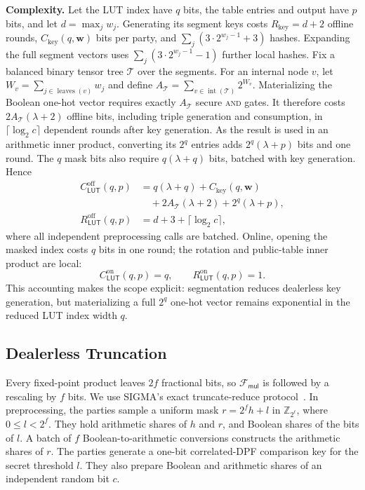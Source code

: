 \documentclass[journal]{IEEEtran}
\theoremstyle{definition}
\theoremstyle{plain}
\newcommand{\Fmul}{\mathcal{F}_{\mathsf{mul}}}
\newcommand{\nseg}{c}                              %
\newcommand{\wseg}{w}                              %
\begin{document}
\textbf{Complexity.} Let the LUT index have $q$ bits, the table entries and
output have $p$ bits, and let
$d=\max_j\wseg_j$. Generating its segment keys costs
$R_{\mathrm{key}}=d+2$ offline rounds,
$C_{\mathrm{key}}(q,\boldsymbol{\wseg})$ bits per party, and
$\sum_j(3\cdot2^{\wseg_j-1}+3)$ hashes. Expanding the full segment vectors
uses $\sum_j(3\cdot2^{\wseg_j-1}-1)$ further local hashes. Fix a balanced binary tensor tree
$\mathcal T$ over the segments. For an internal node $v$, let
$W_v=\sum_{j\in\operatorname{leaves}(v)}\wseg_j$ and define
$A_{\mathcal T}=\sum_{v\in\operatorname{int}(\mathcal T)}2^{W_v}$.
Materializing the Boolean one-hot vector requires exactly $A_{\mathcal T}$
secure \textsc{and} gates. It therefore costs
$2A_{\mathcal T}(\lambda+2)$ offline bits, including triple generation and
consumption, in $\lceil\log_2\nseg\rceil$ dependent rounds after key
generation. As the result is used in an arithmetic inner product, converting
its $2^q$ entries adds $2^q(\lambda+p)$ bits and one round. The $q$ mask bits
also require $q(\lambda+q)$ bits, batched with key generation. Hence
\begin{equation}
\begin{aligned}
C^{\mathrm{off}}_{\mathsf{LUT}}(q,p)
 &=q(\lambda+q)+C_{\mathrm{key}}(q,\boldsymbol{\wseg})\\
 &\quad+2A_{\mathcal T}(\lambda+2)+2^q(\lambda+p),\\
R^{\mathrm{off}}_{\mathsf{LUT}}(q,p)&=d+3+\lceil\log_2\nseg\rceil,
\end{aligned}
\label{eq:lut-offline-cost}
\end{equation}
where all independent preprocessing calls are batched. Online, opening the
masked index costs $q$ bits in one round; the rotation and public-table inner
product are local:
\begin{equation}
C^{\mathrm{on}}_{\mathsf{LUT}}(q,p)=q,\qquad
R^{\mathrm{on}}_{\mathsf{LUT}}(q,p)=1.
\label{eq:lut-online-cost}
\end{equation}
This accounting makes the scope explicit: segmentation reduces dealerless key
generation, but materializing a full $2^q$ one-hot vector remains exponential
in the reduced LUT index width $q$.

\subsection{Dealerless Truncation}\label{sec:trunc}
Every fixed-point product leaves $2f$ fractional bits, so $\Fmul$ is followed
by a rescaling by $f$ bits. We use SIGMA's exact truncate-reduce
protocol~\cite{sigma}. In preprocessing, the parties sample a uniform mask
$r=2^f h+l$ in $\mathbb Z_{2^\ell}$, where $0\le l<2^f$. They hold arithmetic
shares of $h$ and $r$, and Boolean shares of the bits of $l$. A batch of
$f$ Boolean-to-arithmetic conversions constructs the arithmetic shares of $r$.
The parties generate a one-bit correlated-DPF comparison key for the secret
threshold $l$. They also prepare Boolean and arithmetic shares of an independent
random bit $c$.
\end{document}
